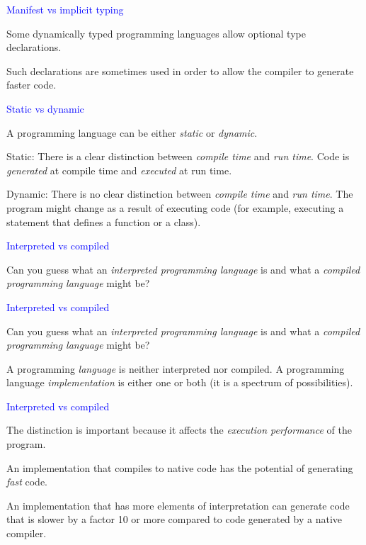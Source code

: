 \documentclass{slides}
\newcommand{\ti}[1]{\begin{center}\Large{\textcolor{blue}{#1}}\end{center}}
\begin{document}
\begin{slide}\ti{Manifest vs implicit typing}

Some dynamically typed programming languages allow optional type
declarations.

Such declarations are sometimes used in order to allow the compiler to
generate faster code.

\vfill\end{slide}
\begin{slide}\ti{Static vs dynamic}

A programming language can be either \emph{static} or \emph{dynamic}.

Static: There is a clear distinction between \emph{compile time} and
\emph{run time}.  Code is \emph{generated} at compile time and
\emph{executed} at run time.

Dynamic: There is no clear distinction between \emph{compile time} and
\emph{run time}.  The program might change as a result of executing
code (for example, executing a statement that defines a function or a
class).

\vfill\end{slide}
\begin{slide}\ti{Interpreted vs compiled}

Can you guess what an \emph{interpreted programming language} is and
what a \emph{compiled programming language} might be?

\vfill\end{slide}
\begin{slide}\ti{Interpreted vs compiled}

Can you guess what an \emph{interpreted programming language} is and
what a \emph{compiled programming language} might be?

A programming \emph{language} is neither interpreted nor compiled.  A
programming language \emph{implementation} is either one or both (it
is a spectrum of possibilities).

\vfill\end{slide}
\begin{slide}\ti{Interpreted vs compiled}

The distinction is important because it affects the \emph{execution
  performance} of the program.

An implementation that compiles to native code has the potential of
generating \emph{fast} code.

An implementation that has more elements of interpretation can
generate code that is slower by a factor 10 or more compared to code
generated by a native compiler.

\vfill\end{slide}
\end{document}
